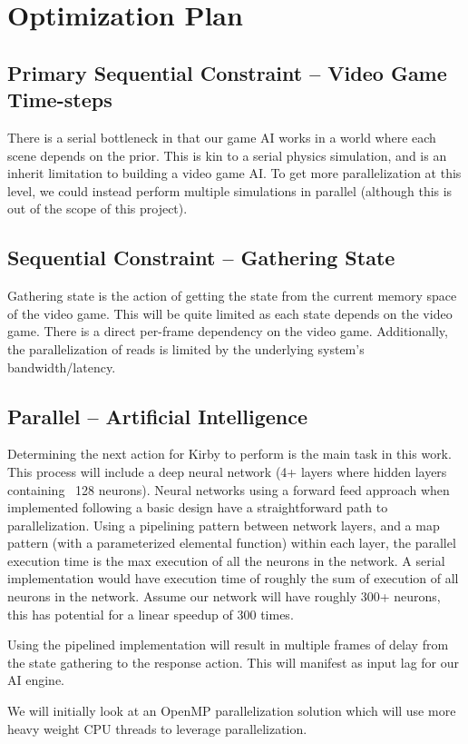 \chapter*{Optimization Plan}

\section{Primary Sequential Constraint -- Video Game Time-steps}
There is a serial bottleneck in that our game AI works in a world where each scene depends on the prior.
This is kin to a serial physics simulation, and is an inherit limitation to building a video game AI.
To get more parallelization at this level, we could instead perform multiple simulations in parallel (although this is out of the scope of this project).

\section{Sequential Constraint -- Gathering State}
Gathering state is the action of getting the state from the current memory space of the video game.
This will be quite limited as each state depends on the video game.
There is a direct per-frame dependency on the video game.
Additionally, the parallelization of reads is limited by the underlying system's bandwidth/latency.

\section{Parallel -- Artificial Intelligence}
Determining the next action for Kirby to perform is the main task in this work.
This process will include a deep neural network (4+ layers where hidden layers containing ~128 neurons).
Neural networks using a forward feed approach when implemented following a basic design have a straightforward path to parallelization. 
Using a pipelining pattern between network layers, and a map pattern (with a parameterized elemental function) within each layer, the parallel execution time is the max execution of all the neurons in the network.
A serial implementation would have execution time of roughly the sum of execution of all neurons in the network.
Assume our network will have roughly 300+ neurons, this has potential for a linear speedup of 300 times.


Using the pipelined implementation will result in multiple frames of delay from the state gathering to the response action.
This will manifest as input lag for our AI engine. 

We will initially look at an OpenMP parallelization solution which will use more heavy weight CPU threads to leverage parallelization. 
